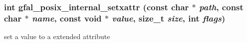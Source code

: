 \subsubsection{\setlength{\rightskip}{0pt plus 5cm}int gfal\_\-posix\_\-internal\_\-setxattr (const char $\ast$ {\em path}, const char $\ast$ {\em name}, const void $\ast$ {\em value}, size\_\-t {\em size}, int {\em flags})}\label{gfal__posix__setxattr_8c_c67a63706af21829d0e7b9209be4cfce}


set a value to a extended attribute 